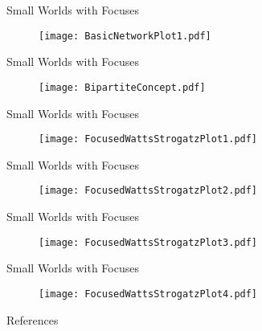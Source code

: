 \documentclass[10pt]{beamer}
\begin{document}
\begin{frame}[fragile]{Small Worlds with Focuses}

	\begin{figure}[h]
    \centering
  \texttt{[image: BasicNetworkPlot1.pdf]}
  	\end{figure}

\end{frame}

\begin{frame}[fragile]{Small Worlds with Focuses}

	\begin{figure}[h]
    \centering
  \texttt{[image: BipartiteConcept.pdf]}
  	\end{figure}

\end{frame}

\begin{frame}[fragile]{Small Worlds with Focuses}

	\begin{figure}[h]
    \centering
  \texttt{[image: FocusedWattsStrogatzPlot1.pdf]}
  	\end{figure}

\end{frame}

\begin{frame}[fragile]{Small Worlds with Focuses}

	\begin{figure}[h]
    \centering
  \texttt{[image: FocusedWattsStrogatzPlot2.pdf]}
  	\end{figure}

\end{frame}

\begin{frame}[fragile]{Small Worlds with Focuses}

	\begin{figure}[h]
    \centering
  \texttt{[image: FocusedWattsStrogatzPlot3.pdf]}
  	\end{figure}

\end{frame}

\begin{frame}[fragile]{Small Worlds with Focuses}

	\begin{figure}[h]
    \centering
  \texttt{[image: FocusedWattsStrogatzPlot4.pdf]}
  	\end{figure}

\end{frame}

\appendix


\begin{frame}[allowframebreaks]{References}

  
  

\end{frame}
\end{document}
